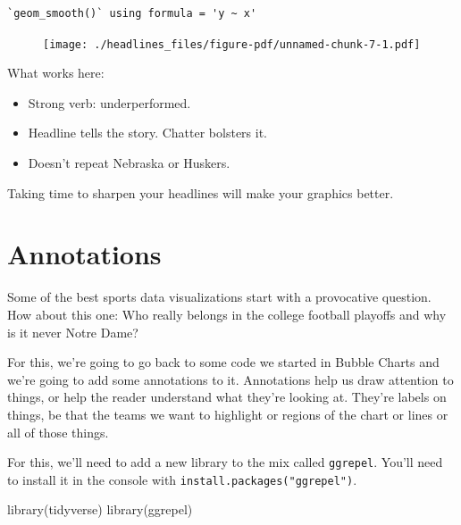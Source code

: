 \documentclass[
  letterpaper,
  DIV=11,
  numbers=noendperiod]{scrreprt}
\newenvironment{Shaded}{\begin{snugshade}}{\end{snugshade}}
\newcommand{\FunctionTok}[1]{\textcolor[rgb]{0.28,0.35,0.67}{#1}}
\newcommand{\NormalTok}[1]{\textcolor[rgb]{0.00,0.23,0.31}{#1}}
\providecommand{\tightlist}{%
  \setlength{\itemsep}{0pt}\setlength{\parskip}{0pt}}\usepackage{longtable,booktabs,array}
\begin{document}
\begin{verbatim}
`geom_smooth()` using formula = 'y ~ x'
\end{verbatim}

\begin{figure}[H]

{\centering \texttt{[image: ./headlines\_files/figure-pdf/unnamed-chunk-7-1.pdf]}

}

\end{figure}

What works here:

\begin{itemize}
\tightlist
\item
  Strong verb: underperformed.
\item
  Headline tells the story. Chatter bolsters it.
\item
  Doesn't repeat Nebraska or Huskers.
\end{itemize}

Taking time to sharpen your headlines will make your graphics better.


\hypertarget{annotations}{%
\chapter{Annotations}\label{annotations}}

Some of the best sports data visualizations start with a provocative
question. How about this one: Who really belongs in the college football
playoffs and why is it never Notre Dame?

For this, we're going to go back to some code we started in Bubble
Charts and we're going to add some annotations to it. Annotations help
us draw attention to things, or help the reader understand what they're
looking at. They're labels on things, be that the teams we want to
highlight or regions of the chart or lines or all of those things.

For this, we'll need to add a new library to the mix called
\texttt{ggrepel}. You'll need to install it in the console with
\texttt{install.packages("ggrepel")}.

\begin{Shaded}
\begin{Highlighting}[]
\FunctionTok{library}\NormalTok{(tidyverse)}
\FunctionTok{library}\NormalTok{(ggrepel)}
\end{Highlighting}
\end{Shaded}
\end{document}
